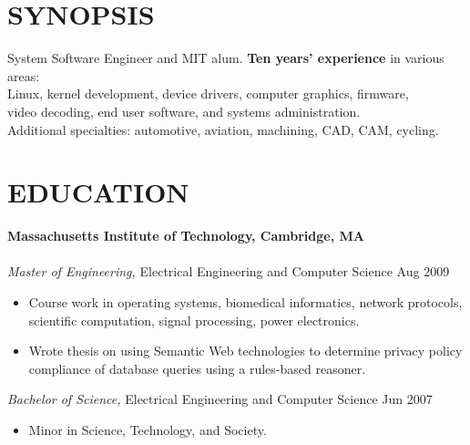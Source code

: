 \documentclass[line,margin]{res}
\begin{document}
\address{1201 West Park Street, Cedar Park, TX 78613-2801}
\address{\href{mailto:jsoltren@alum.mit.edu}{jsoltren@alum.mit.edu}
         (347) 503-9558
         \url{https://www.linkedin.com/in/jsoltren}}

 
\begin{resume}
 
\section{SYNOPSIS}
System Software Engineer and MIT alum. \textbf{Ten years’ experience}
in various areas:\\
Linux, kernel development, device drivers, computer graphics, firmware,\\
video decoding, end user software, and systems administration.\\
Additional specialties: automotive, aviation, machining, CAD, CAM, cycling.
 
 
\section{EDUCATION}

\textbf{Massachusetts Institute of Technology, Cambridge, MA} \\
\\
\textit{Master of Engineering,} Electrical Engineering and Computer Science
\hfill Aug 2009
\begin{itemize}  \itemsep -2pt %
\item Course work in operating systems, biomedical informatics, network
      protocols, scientific computation, signal processing, power electronics.
\item Wrote thesis on using Semantic Web technologies to determine privacy
      policy compliance of database queries using a rules-based reasoner.
\end{itemize} 
\textit{Bachelor of Science,} Electrical Engineering and Computer Science
\hfill Jun 2007
\begin{itemize}  \itemsep -2pt %
\item Minor in Science, Technology, and Society.
\end{itemize}


\end{resume}
\end{document}
